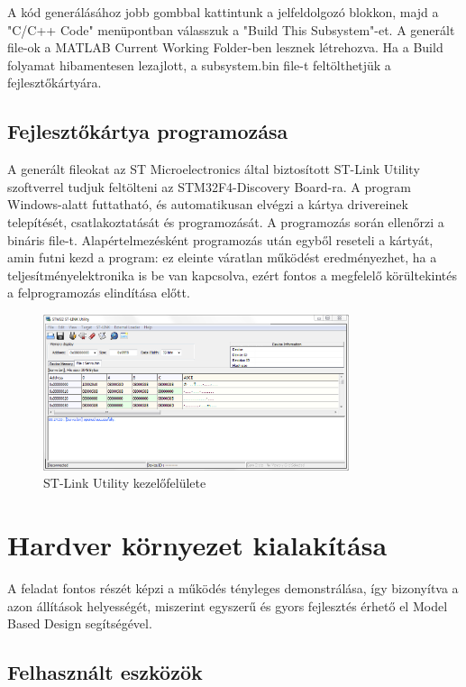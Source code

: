 A kód generálásához jobb gombbal kattintunk a jelfeldolgozó blokkon, majd a "C/C++ Code" menüpontban válasszuk a "Build This Subsystem"-et. A generált file-ok a MATLAB Current Working Folder-ben lesznek létrehozva. Ha a Build folyamat hibamentesen lezajlott, a subsystem.bin file-t feltölthetjük a fejlesztőkártyára.

\subsection{Fejlesztőkártya programozása}

A generált fileokat az ST Microelectronics által biztosított ST-Link Utility szoftverrel tudjuk feltölteni az STM32F4-Discovery Board-ra. A program Windows-alatt futtatható, és automatikusan elvégzi a kártya drivereinek telepítését, csatlakoztatását és programozását. A programozás során ellenőrzi a bináris file-t. Alapértelmezésként programozás után egyből reseteli a kártyát, amin futni kezd a program: ez eleinte váratlan működést eredményezhet, ha a teljesítményelektronika is be van kapcsolva, ezért fontos a megfelelő körültekintés a felprogramozás elindítása előtt.

\begin{figure}[H]
	\centering
	\includegraphics[width=0.8\textwidth]{fig/stlink}
	\caption{ST-Link Utility kezelőfelülete}
	\label{fig:stlink}
\end{figure}

\section{Hardver környezet kialakítása}

A feladat fontos részét képzi a működés tényleges demonstrálása, így bizonyítva a azon állítások helyességét, miszerint egyszerű és gyors fejlesztés érhető el Model Based Design segítségével.

\subsection{Felhasznált eszközök}

